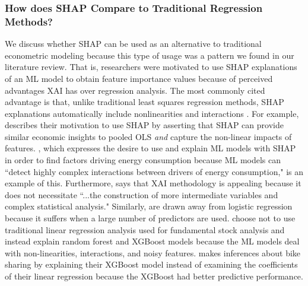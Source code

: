 \documentclass[mnsc,blindrev]{informs3}
\begin{document}
\subsubsection{How does SHAP Compare to Traditional Regression Methods?}
    We discuss whether SHAP can be used as an alternative to traditional econometric modeling because this type of usage was a pattern we found in our literature review. That is, researchers were motivated to use SHAP explanations of an ML model to obtain feature importance values because of perceived advantages XAI has over regression analysis. The most commonly cited advantage is that, unlike traditional least squares regression methods, SHAP explanations automatically include nonlinearities and interactions \cite{hanauer22boosting,berger2023supply,srivastava23energy,banulescu2023practical,li24roles}. For example, \cite{berger2023supply} describes their motivation to use SHAP by asserting that SHAP can provide similar economic insights to pooled OLS \emph{and} capture the non-linear impacts of features. \cite{srivastava23energy}, which expresses the desire to use and explain ML models with SHAP in order to find factors driving energy consumption because ML models can ``detect highly complex interactions between drivers of energy consumption," is an example of this. Furthermore, \cite{zhou23consumption} says that XAI methodology is appealing because it does not necessitate ``...the construction of more intermediate variables and complex statistical analysis." Similarly, \cite{banulescu2023practical} are drawn away from logistic regression because it suffers when a large number of predictors are used. \cite{hanauer22boosting} choose not to use traditional linear regression analysis used for fundamental stock analysis and instead explain random forest and XGBoost models because the ML models deal with non-linearities, interactions, and noisy features. \cite{li24roles} makes inferences about bike sharing by explaining their XGBoost model instead of examining the coefficients of their linear regression because the XGBoost had better predictive performance. 
\end{document}
